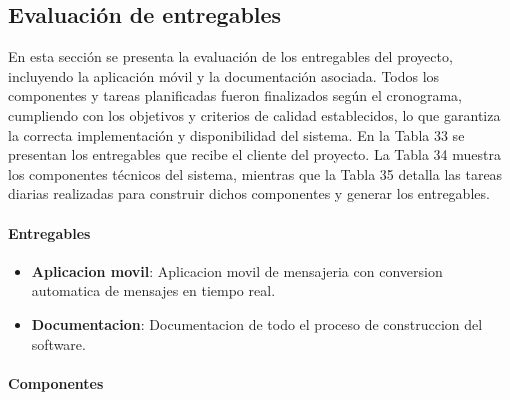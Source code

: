 \documentclass[lettersize,journal]{IEEEtran}
\begin{document}
\subsection {Evaluación de entregables}

\noindent En esta sección se presenta la evaluación de los entregables del proyecto, incluyendo la aplicación móvil y la documentación asociada. Todos los componentes y tareas planificadas fueron finalizados según el cronograma, cumpliendo con los objetivos y criterios de calidad establecidos, lo que garantiza la correcta implementación y disponibilidad del sistema. En la Tabla 33 se presentan los entregables que recibe el cliente del proyecto. La Tabla 34 muestra los componentes técnicos del sistema, mientras que la Tabla 35 detalla las tareas diarias realizadas para construir dichos componentes y generar los entregables.

\paragraph{Entregables}


\begin{itemize}
	\item \textbf{Aplicacion movil}: Aplicacion movil de mensajeria con conversion automatica de mensajes en tiempo real.
	\item \textbf{Documentacion}: Documentacion de todo el proceso de construccion del software.
\end{itemize}

\paragraph{Componentes}
\end{document}
